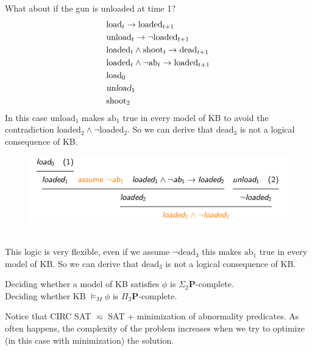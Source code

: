 What about if the gun is unloaded at time 1? 
\begin{align*}
    &\text{load}_t\to \text{loaded}_{t+1}\\
    &\text{unload}_t\to \neg \text{loaded}_{t+1}\\
    &\text{loaded}_t\land \text{shoot}_t\to \text{dead}_{t+1}\\
    &\text{loaded}_t\land\neg\text{ab}_t\to \text{loaded}_{t+1}\\
    &\text{load}_0 \\
    & \textsl{unload}_1 \\
    &\text{shoot}_2
\end{align*}
In this case $\text{unload}_1$ makes $\text{ab}_1$
true in every model of KB to avoid the contradiction $\text{loaded}_2\land \neg\text{loaded}_2$. So we can derive that $\text{dead}_3$ is not a logical consequence of KB.
\begin{figure}[h]
    \centering
    \includegraphics[width=1\textwidth]{img/ysp3.jpeg}
\end{figure}\\
This logic is very flexible, even if we assume $\neg\text{dead}_3$ this makes $\text{ab}_1$ true in every model of KB. So we can derive that $\text{dead}_3$ is not a logical consequence of KB.
\begin{defbox}
    Deciding whether a model of KB satisfies $\phi$ is $\Sigma_2\mathbf{P}$-complete.\\
    Deciding whether KB $\vDash_M \phi$ is $\Pi_2\mathbf{P}$-complete.
\end{defbox}
Notice that CIRC SAT $\eqsim$ SAT + minimization of abnormality predicates. As often happens, the complexity of the problem increases when we try to optimize (in this case with minimization) the solution.


